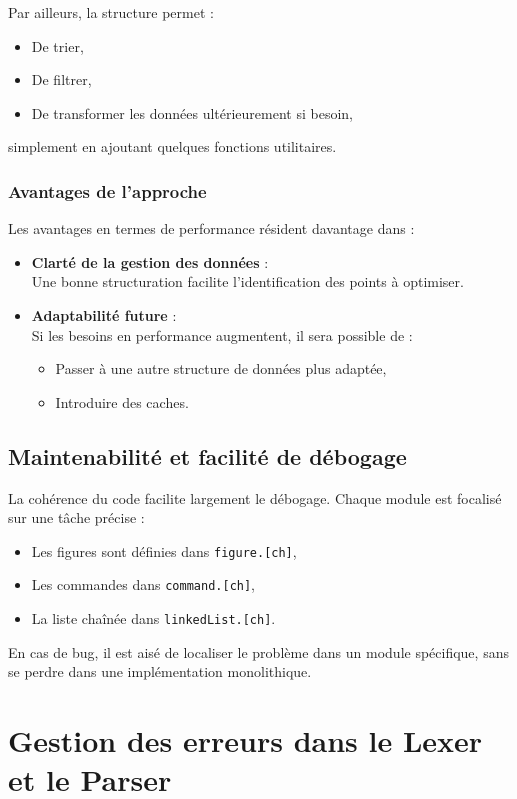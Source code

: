 \documentclass[12pt,a4paper]{article}
\begin{document}
Par ailleurs, la structure permet :
\begin{itemize}
    \item De trier,
    \item De filtrer,
    \item De transformer les données ultérieurement si besoin,
\end{itemize}
simplement en ajoutant quelques fonctions utilitaires.

\subsubsection*{Avantages de l’approche}
Les avantages en termes de performance résident davantage dans :
\begin{itemize}
    \item \textbf{Clarté de la gestion des données} : \\
    Une bonne structuration facilite l’identification des points à optimiser.
    \item \textbf{Adaptabilité future} : \\
    Si les besoins en performance augmentent, il sera possible de :
    \begin{itemize}
        \item Passer à une autre structure de données plus adaptée,
        \item Introduire des caches.
    \end{itemize}
\end{itemize}

\subsection{Maintenabilité et facilité de débogage}
La cohérence du code facilite largement le débogage. Chaque module est focalisé sur une tâche précise :
\begin{itemize}
    \item Les figures sont définies dans \texttt{figure.[ch]},
    \item Les commandes dans \texttt{command.[ch]},
    \item La liste chaînée dans \texttt{linkedList.[ch]}.
\end{itemize}

En cas de bug, il est aisé de localiser le problème dans un module spécifique, sans se perdre dans une implémentation monolithique.


\newpage
\section{Gestion des erreurs dans le Lexer et le Parser}
\end{document}
